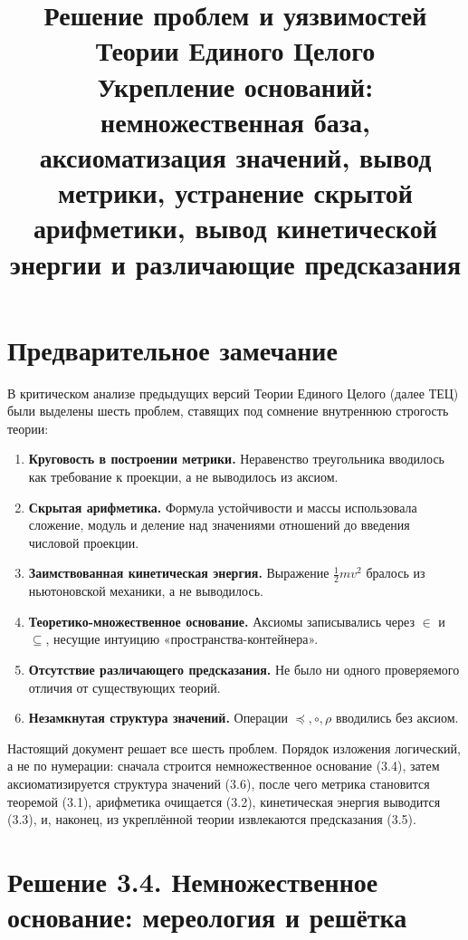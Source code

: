 \documentclass[12pt,a4paper]{article}
\title{\textbf{Решение проблем и уязвимостей Теории Единого Целого}\\[0.5em]
\large Укрепление оснований: немножественная база, аксиоматизация значений,
вывод метрики, устранение скрытой арифметики, вывод кинетической энергии и
различающие предсказания}
\author{}
\date{}
\theoremstyle{definition}
\theoremstyle{plain}
\theoremstyle{remark}
\newcommand{\comp}{\circ}
\newcommand{\Vord}{\preceq}
\newcommand{\norm}{\rho}
\begin{document}
\maketitle
\tableofcontents
\newpage

\section*{Предварительное замечание}

В критическом анализе предыдущих версий Теории Единого Целого (далее ТЕЦ) были
выделены шесть проблем, ставящих под сомнение внутреннюю строгость теории:

\begin{enumerate}
    \item[(3.1)] \textbf{Круговость в построении метрики.} Неравенство
    треугольника вводилось как требование к проекции, а не выводилось из аксиом.
    \item[(3.2)] \textbf{Скрытая арифметика.} Формула устойчивости и массы
    использовала сложение, модуль и деление над значениями отношений до введения
    числовой проекции.
    \item[(3.3)] \textbf{Заимствованная кинетическая энергия.} Выражение
    $\tfrac12 m v^2$ бралось из ньютоновской механики, а не выводилось.
    \item[(3.4)] \textbf{Теоретико-множественное основание.} Аксиомы записывались
    через $\in$ и $\subseteq$, несущие интуицию «пространства-контейнера».
    \item[(3.5)] \textbf{Отсутствие различающего предсказания.} Не было ни одного
    проверяемого отличия от существующих теорий.
    \item[(3.6)] \textbf{Незамкнутая структура значений.} Операции
    $\Vord,\comp,\norm$ вводились без аксиом.
\end{enumerate}

Настоящий документ решает все шесть проблем. Порядок изложения логический, а не
по нумерации: сначала строится немножественное основание (3.4), затем
аксиоматизируется структура значений (3.6), после чего метрика становится
теоремой (3.1), арифметика очищается (3.2), кинетическая энергия выводится (3.3),
и, наконец, из укреплённой теории извлекаются предсказания (3.5).

\section{Решение 3.4. Немножественное основание: мереология и решётка}
\end{document}
